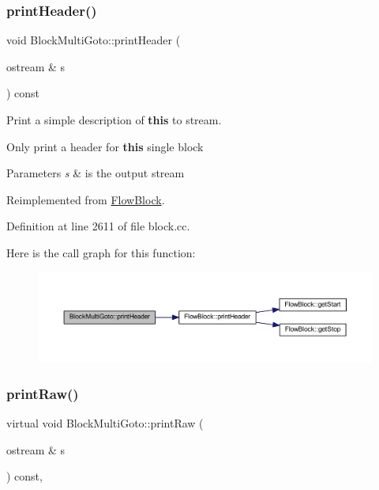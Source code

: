 \subsubsection{\texorpdfstring{printHeader()}{printHeader()}}
{\footnotesize\ttfamily void Block\+Multi\+Goto\+::print\+Header (\begin{DoxyParamCaption}\item[{ostream \&}]{s }\end{DoxyParamCaption}) const\hspace{0.3cm}{\ttfamily [virtual]}}



Print a simple description of {\bfseries{this}} to stream. 

Only print a header for {\bfseries{this}} single block 
\begin{DoxyParams}{Parameters}
{\em s} & is the output stream \\
\hline
\end{DoxyParams}


Reimplemented from \mbox{\hyperlink{class_flow_block_a0d19c5b80186cf289dfbe0ce9e3ce37a}{Flow\+Block}}.



Definition at line 2611 of file block.\+cc.

Here is the call graph for this function\+:
\nopagebreak
\begin{figure}[H]
\begin{center}
\leavevmode
\includegraphics[width=350pt]{class_block_multi_goto_a0886201717ed839e30e4e8e2b39d33d7_cgraph}
\end{center}
\end{figure}
\mbox{\label{class_block_multi_goto_a56b9c331488b4bf0c0f01cc583192630}} 
\subsubsection{\texorpdfstring{printRaw()}{printRaw()}}
{\footnotesize\ttfamily virtual void Block\+Multi\+Goto\+::print\+Raw (\begin{DoxyParamCaption}\item[{ostream \&}]{s }\end{DoxyParamCaption}) const\hspace{0.3cm}{\ttfamily [inline]}, {\ttfamily [virtual]}}



